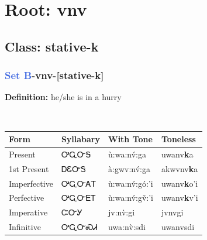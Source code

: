 \needspace{4in}
\section*{Root: vnv}
\nopagebreak
{}
\needspace{3in}
\subsection*{Class: stative-k}
\nopagebreak
\needspace{2in}
\subsubsection*{\textcolor{RoyalBlue}{Set B}{-}\textbf{vnv}{-}[stative-k]}
\nopagebreak
\textbf{Definition: } he/she is in a hurry
\\[0.5em]
\begin{tabularx}{\textwidth}{l X X X}%
\toprule%
\textbf{Form}&\textbf{Syllabary}&\textbf{With Tone}&\textbf{Toneless}\\%
\midrule%
Present&ᎤᏩᏅᎦ&ù:wa:nv́:ga&uwanv\textbf{k}a\\%
1st Present&ᎠᏋᏅᎦ&à:gwv:nv́:ga&akwvnv\textbf{k}a\\%
Imperfective&ᎤᏩᏅᎪᎢ&ù:wa:nv́:gó:’i&uwanv\textbf{k}o'i\\%
Perfective&ᎤᏩᏅᎬᎢ&ù:wa:nv́:gv̌:’i&uwanv\textbf{k}v'i\\%
Imperative&ᏨᏅᎩ&jv:nv̀:gi&jvnvgi\\%
Infinitive&ᎤᏩᏅᏍᏗ&uwa:nv̀:sdi&uwanvsdi\\%
\bottomrule%
\end{tabularx}
\\[1em]
